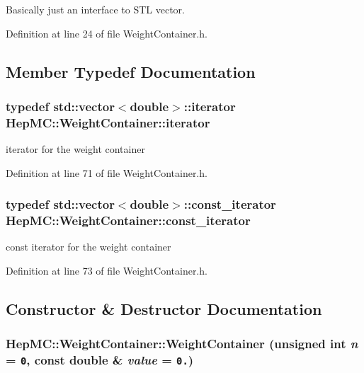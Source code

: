 Basically just an interface to STL vector. 



Definition at line 24 of file Weight\-Container.h.

\subsection{Member Typedef Documentation}
\subsubsection{\setlength{\rightskip}{0pt plus 5cm}typedef std::vector$<$double$>$::{\bf iterator} {\bf Hep\-MC::Weight\-Container::iterator}}\label{classHepMC_1_1WeightContainer_107b1328190d5c21739ed4bff584646e}


iterator for the weight container 



Definition at line 71 of file Weight\-Container.h.
\subsubsection{\setlength{\rightskip}{0pt plus 5cm}typedef std::vector$<$double$>$::{\bf const\_\-iterator} {\bf Hep\-MC::Weight\-Container::const\_\-iterator}}\label{classHepMC_1_1WeightContainer_47336573f54b8e7e6f0622b02cdba497}


const iterator for the weight container 



Definition at line 73 of file Weight\-Container.h.

\subsection{Constructor \& Destructor Documentation}
\subsubsection{\setlength{\rightskip}{0pt plus 5cm}Hep\-MC::Weight\-Container::Weight\-Container (unsigned int {\em n} = {\tt 0}, const double \& {\em value} = {\tt 0.})\hspace{0.3cm}{\tt  [inline]}}\label{classHepMC_1_1WeightContainer_9fd88c9b4c0f82a3fa67dbc71ef0268b}


